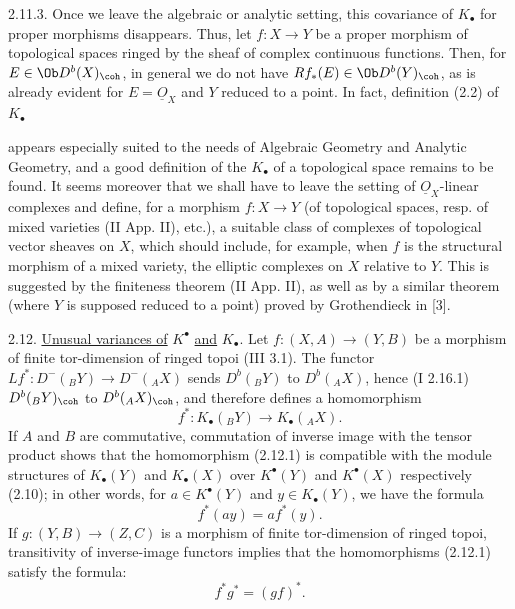 2.11.3. Once we leave the algebraic or analytic setting, this covariance of \(K_{\bullet}\) for proper morphisms disappears. Thus, let \(f:X\to Y\) be a proper morphism of topological spaces ringed by the sheaf of complex continuous functions. Then, for \(E\in\Ob D^b(X)_{\coh}\), in general we do not have \(Rf_*(E)\in\Ob D^b(Y)_{\coh}\), as is already evident for \(E=\underline{O}_X\) and \(Y\) reduced to a point. In fact, definition (2.2) of \(K_{\bullet}\)

%
appears especially suited to the needs of Algebraic Geometry and Analytic Geometry, and a good definition of the \(K_{\bullet}\) of a topological space remains to be found. It seems moreover that we shall have to leave the setting of \(\underline{O}_X\)-linear complexes and define, for a morphism \(f:X\to Y\) (of topological spaces, resp. of mixed varieties (II App. II), etc.), a suitable class of complexes of topological vector sheaves on \(X\), which should include, for example, when \(f\) is the structural morphism of a mixed variety, the elliptic complexes on \(X\) relative to \(Y\). This is suggested by the finiteness theorem (II App. II), as well as by a similar theorem (where \(Y\) is supposed reduced to a point) proved by Grothendieck in [3].

2.12. \uline{Unusual variances of} \(K^{\bullet}\) \uline{and} \(K_{\bullet}\). Let \(f:(X,A)\longrightarrow(Y,B)\) be a morphism of finite tor-dimension of ringed topoi (III 3.1). The functor \(Lf^*:D^-({}_B Y)\longrightarrow D^-({}_A X)\) sends \(D^b({}_B Y)\) to \(D^b({}_A X)\), hence (I 2.16.1) \(D^b({}_B Y)_{\coh}\) to \(D^b({}_A X)_{\coh}\), and therefore defines a homomorphism
\begin{equation}\tag{2.12.1}
 f^*:K_\bullet({}_B Y)\longrightarrow K_\bullet({}_A X).
\end{equation}
If \(A\) and \(B\) are commutative, commutation of inverse image with the tensor product shows that the homomorphism (2.12.1) is compatible with the module structures of \(K_{\bullet}(Y)\) and \(K_{\bullet}(X)\) over \(K^{\bullet}(Y)\) and \(K^{\bullet}(X)\) respectively (2.10); in other words, for \(a\in K^{\bullet}(Y)\) and \(y\in K_{\bullet}(Y)\), we have the formula
\begin{equation}\tag{2.12.2}
 f^*(ay)=a f^*(y).
\end{equation}
If \(g:(Y,B)\to(Z,C)\) is a morphism of finite tor-dimension of ringed topoi, transitivity of inverse-image functors implies that the homomorphisms (2.12.1) satisfy the formula:
\begin{equation}\tag{2.12.1.1}
 f^*g^*=(gf)^*.
\end{equation}

